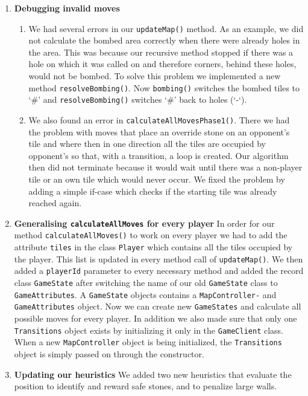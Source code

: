 \begin{enumerate}
    \item \textbf{Debugging invalid moves}
        \begin{enumerate}
            \item 
            We had several errors in our \texttt{updateMap()} method. As an example, we did not calculate the bombed area correctly when there were already holes in the area. This was because our recursive method stopped if there was a hole on which it was called on and therefore corners, behind these holes, would not be bombed. To solve this problem we implemented a new method \texttt{resolveBombing()}. Now \texttt{bombing()} switches the bombed tiles to ‘\#’ and \texttt{resolveBombing()} switches ‘\#’ back to holes (‘-‘).
            \item
            We also found an error in \texttt{calculateAllMovesPhase1()}. There we had the problem with moves that place an override stone on an opponent’s tile and where then in one direction all the tiles are occupied by opponent’s so that, with a transition, a loop is created. Our algorithm then did not terminate because it would wait until there was a non-player tile or an own tile which would never occur. We fixed the problem by adding a simple if-case which checks if the starting tile was already reached again.
        \end{enumerate}

    \item \textbf{Generalising \texttt{calculateAllMoves} for every player}
        In order for our method \texttt{calculateAllMoves()} to work on every player we had to add the attribute \texttt{tiles} in the class \texttt{Player} which contains all the tiles occupied by the player. This list is updated in every method call of \texttt{updateMap()}. We then added a \texttt{playerId} parameter to every necessary method and added the record class \texttt{GameState} after switching the name of our old \texttt{GameState} class to \texttt{GameAttributes}. A \texttt{GameState} objects contains a \texttt{MapController-} and \texttt{GameAttributes} object. Now we can create new \texttt{GameStates} and calculate all possible moves for every player. In addition we also made sure that only one \texttt{Transitions} object exists by initializing it only in the \texttt{GameClient} class. When a new \texttt{MapController} object is being initialized, the \texttt{Transitions} object is simply passed on through the constructor.
        
    \item \textbf{Updating our heuristics}
        \noindent We added two new heuristics that evaluate the position to identify and reward safe stones, and to penalize large walls.


\end{enumerate}
